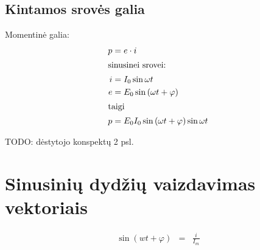 \subsection{Kintamos srovės galia}

Momentinė galia:
\begin{align*}
  p &= e \cdot i \\
  \intertext{sinusinei srovei:}
  i &= I_{0} \sin \omega t \\
  e &= E_{0} \sin \left( \omega t + \varphi \right) \\
  \intertext{taigi}
  p &= E_{0} I_{0} \sin \left( \omega t + \varphi \right) \sin \omega t \\
\end{align*}

TODO: dėstytojo konspektų 2 psl.

\section{Sinusinių dydžių vaizdavimas vektoriais}

\begin{align*}
  \sin (wt + \varphi) &=& \frac{i}{I_{m}} \\
\end{align*}
